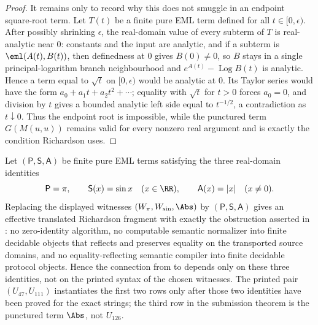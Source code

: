 \begin{proof}
It remains only to record why this does not smuggle in an endpoint square-root
term.  Let \(T(t)\) be a finite pure EML term defined for all
\(t\in[0,\epsilon)\).  After possibly shrinking \(\epsilon\), the real-domain
value of every subterm of \(T\) is real-analytic near \(0\): constants and the
input are analytic, and if a subterm is \(\eml(A(t),B(t))\), then definedness at
\(0\) gives \(B(0)\ne0\), so \(B\) stays in a single principal-logarithm branch
neighbourhood and \(e^{A(t)}-\operatorname{Log}B(t)\) is analytic.  Hence a term
equal to \(\sqrt t\) on \([0,\epsilon)\) would be analytic at \(0\).  Its Taylor
series would have the form \(a_0+a_1t+a_2t^2+\cdots\); equality with \(\sqrt t\)
for \(t>0\) forces \(a_0=0\), and division by \(t\) gives a bounded analytic
left side equal to \(t^{-1/2}\), a contradiction as \(t\downarrow0\).  Thus the
endpoint root is impossible, while the punctured term \(G(M(u,u))\) remains
valid for every nonzero real argument and is exactly the condition Richardson
uses.
\end{proof}

\begin{proposition}
\label{prop:three-witness-stability}
\label{prop:three-witness-richardson-stability}
Let \((\mathsf P,\mathsf S,\mathsf A)\) be finite pure EML terms satisfying the
three real-domain identities
\[
  \mathsf P=\pi,
  \qquad \mathsf S(x)=\sin x\quad(x\in\RR),
  \qquad \mathsf A(x)=|x|\quad(x\ne0).
\]
Replacing the displayed witnesses \((W_{\pi},W_{\sin},\Abs)\) by
\((\mathsf P,\mathsf S,\mathsf A)\) gives an effective translated Richardson
fragment with exactly the obstruction asserted in : no
zero-identity algorithm, no computable semantic normalizer into finite decidable
objects that reflects and preserves equality on the transported source domains,
and no equality-reflecting semantic compiler into finite decidable protocol
objects.  Hence the connection from  to
 depends only on
these three identities, not on the printed syntax of the chosen witnesses.  The
printed pair \((U_{47},U_{111})\) instantiates the first two rows only after those
two identities have been proved for the exact strings; the third row in the
submission theorem is the punctured term \(\Abs\), not \(U_{126}\).
\end{proposition}

